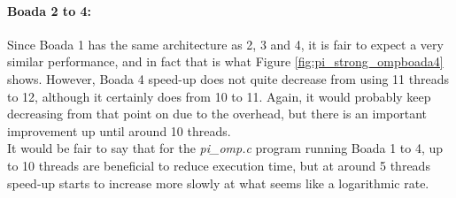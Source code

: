 \documentclass[12]{article}
\begin{document}
\bigskip
\paragraph{Boada 2 to 4:}
Since Boada 1 has the same architecture as 2, 3 and 4, it is fair to expect a very similar performance, and in fact that is what Figure \ref{fig:pi_strong_ompboada4} shows. However, Boada 4 speed-up does not quite decrease from using 11 threads to 12, although it certainly does from 10 to 11. Again, it would probably keep decreasing from that point on due to the overhead, but there is an important improvement up until around 10 threads. \\


It would be fair to say that for the \textit{pi\_omp.c} program running Boada 1 to 4, up to 10 threads are beneficial to reduce execution time, but at around 5 threads speed-up starts to increase more slowly at what seems like a logarithmic rate.
\end{document}
